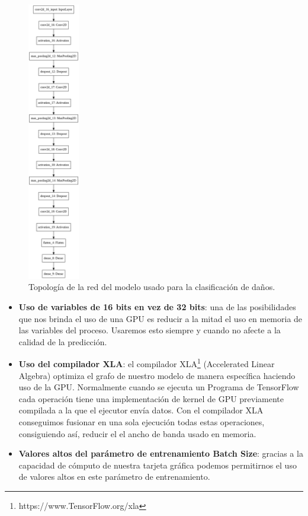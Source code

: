 \begin{figure}
    \centering
    \includegraphics[width=0.2\textwidth]{images/chapter2/model.png}
    \caption{Topología de la red del modelo  usado para la clasificación de daños.}
    \label{fig:Topología de la red del modelo de redes neuronales.}
\end{figure}


\begin{itemize}
    \item \textbf{Uso de variables de 16 bits en vez de 32 bits}: una de las posibilidades que nos brinda el uso de una GPU es reducir a la mitad el uso en memoria de las variables del proceso.
    Usaremos esto siempre y cuando no afecte a la calidad de la predicción.
    \item \textbf{Uso del compilador XLA}: el compilador XLA\footnote{https://www.TensorFlow.org/xla} (Accelerated Linear Algebra) optimiza el grafo de nuestro modelo de manera específica haciendo uso de la GPU.
    Normalmente cuando se ejecuta un Programa de TensorFlow cada operación tiene una implementación de kernel de GPU previamente compilada a la que el ejecutor envía datos.
    Con el compilador XLA conseguimos fusionar en una sola ejecución todas estas operaciones, consiguiendo así, reducir el el ancho de banda usado en memoria.
    \item \textbf{Valores altos del parámetro de entrenamiento Batch Size}: gracias a la capacidad de cómputo de nuestra tarjeta gráfica podemos permitirnos el uso de valores altos en este parámetro de entrenamiento.
\end{itemize}


